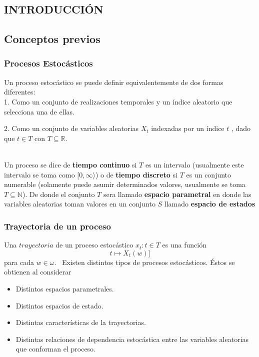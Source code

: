 \documentclass[10pt,a4paper]{article}
\theoremstyle{definition}
\theoremstyle{remark}
\begin{document}
\begin{multicols}{2}
\begin{center}
\section {INTRODUCCIÓN}
\end{center}



\subsection{Conceptos previos}
\subsubsection{Procesos Estocásticos}\label{sec:nada}

Un proceso estocástico se puede definir equivalentemente de dos formas diferentes:\\
1. Como un conjunto de realizaciones temporales y un índice aleatorio que selecciona una 
de ellas.\

2. Como un conjunto de variables aleatorias $X_{t}$ indexadas por un índice $t$ , dado 
que $t \in T$ con $T\subseteq \mathbb{R} $.
\\\

Un proceso se dice de \textbf{tiempo continuo} si $T$ es un intervalo (usualmente este 
intervalo se toma como $[0,\infty\rangle$) o de \textbf{tiempo discreto} si $T$ es un 
conjunto numerable (solamente puede asumir determinados valores, usualmente se toma $T 
\subseteq \mathbb{N}$). De donde el conjunto $T$ sera llamado \textbf{espacio 
parametral} en donde las variables aleatorias toman valores en un conjunto $S$ llamado 
\textbf{espacio de estados}
\subsubsection{Trayectoria de un proceso}\label{sec:nada2}
Una $trayectoria$ de un proceso estocástico $x_{t}: t \in T$ es una función $$t 
\longmapsto X_{t}(w)]$$ para cada $w \in \omega.$
\ Existen distintos tipos de procesos estocásticos. Éstos se obtienen al considerar 
\begin{itemize}
	\item Distintos espacios parametrales.
	\item Distintos espacios de estado.
	\item Distintas características de la trayectorias.
	\item Distintas relaciones de dependencia estocástica entre las variables aleatorias 
	que conforman el proceso.
\end{itemize}

\end{multicols}
\end{document}
